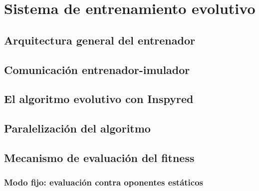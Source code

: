 \chapter{Sistema de entrenamiento evolutivo} \label{chap:entrenador}


\section{Arquitectura general del entrenador} \label{sec:arquitectura_entrenador}


\section{Comunicación entrenador-imulador} \label{sec:comunicacion_entrenador_simulador}


\section{El algoritmo evolutivo con Inspyred} \label{sec:algoritmo_evolutivo_inspyred}


\section{Paralelización del algoritmo} \label{sec:paralelizacion_algoritmo}


\section{Mecanismo de evaluación del fitness} \label{sec:mecanismos_evaluacion_fitness}

\subsection{Modo fijo: evaluación contra oponentes estáticos} \label{sec:modo_fijo_evaluacion}


